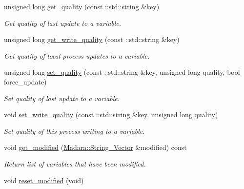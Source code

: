 \begin{DoxyCompactItemize}
unsigned long \hyperlink{classMadara_1_1Knowledge__Engine_1_1Thread__Safe__Context_a7fc69cd862105ff4dc150e9f85a22d58}{get\_\-quality} (const ::std::string \&key)
\begin{DoxyCompactList}\small\item\em Get quality of last update to a variable. \item\end{DoxyCompactList}\item 
unsigned long \hyperlink{classMadara_1_1Knowledge__Engine_1_1Thread__Safe__Context_ad9b368999a28306558ee4ffa589b4f55}{get\_\-write\_\-quality} (const ::std::string \&key)
\begin{DoxyCompactList}\small\item\em Get quality of local process updates to a variable. \item\end{DoxyCompactList}\item 
unsigned long \hyperlink{classMadara_1_1Knowledge__Engine_1_1Thread__Safe__Context_a595b9624264a67db13824642f4ea520b}{set\_\-quality} (const ::std::string \&key, unsigned long quality, bool force\_\-update)
\begin{DoxyCompactList}\small\item\em Set quality of last update to a variable. \item\end{DoxyCompactList}\item 
void \hyperlink{classMadara_1_1Knowledge__Engine_1_1Thread__Safe__Context_a648dc63feb8f7f764b340fbfa0efd521}{set\_\-write\_\-quality} (const ::std::string \&key, unsigned long quality)
\begin{DoxyCompactList}\small\item\em Set quality of this process writing to a variable. \item\end{DoxyCompactList}\item 
void \hyperlink{classMadara_1_1Knowledge__Engine_1_1Thread__Safe__Context_ab849d015e0e1d272d38bcf8dbace0798}{get\_\-modified} (\hyperlink{namespaceMadara_a5555eaae3fdb02fcc2691b8ff0178e1c}{Madara::String\_\-Vector} \&modified) const 
\begin{DoxyCompactList}\small\item\em Return list of variables that have been modified. \item\end{DoxyCompactList}\item 
void \hyperlink{classMadara_1_1Knowledge__Engine_1_1Thread__Safe__Context_ae145dd7dd6ef1b18a230fe44dd0864e9}{reset\_\-modified} (void)

\end{DoxyCompactItemize}
